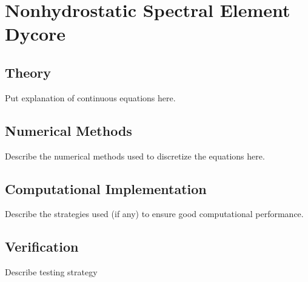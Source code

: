 \section{Nonhydrostatic Spectral Element Dycore}

\subsection{Theory}

Put explanation of continuous equations here.

\subsection{Numerical Methods}

Describe the numerical methods used to discretize the equations here.

\subsection{Computational Implementation}

Describe the strategies used (if any) to ensure good computational performance.

\subsection{Verification}

Describe testing strategy
